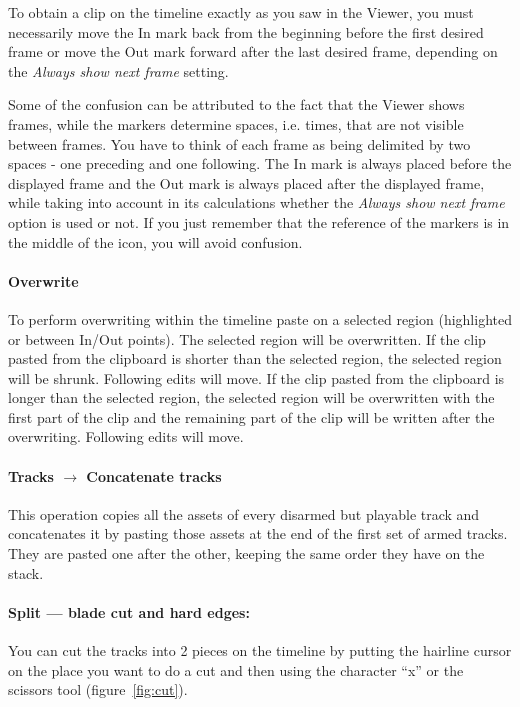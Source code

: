 To obtain a clip on the timeline exactly as you saw in the Viewer, you must necessarily move the In mark back from the beginning before the first desired frame or move the Out mark forward after the last desired frame, depending on the \textit{Always show next frame} setting. 

Some of the confusion can be attributed to the fact that the Viewer shows frames, while the markers determine spaces, i.e. times, that are not visible between frames. You have to think of each frame as being delimited by two spaces - one preceding and one following.  The In mark is always placed before the displayed frame and the Out mark is always placed after the displayed frame, while taking into account in its calculations whether the \textit{Always show next frame }option is used or not. If you just remember that the reference of the markers is in the middle of the icon, you will avoid confusion.

\paragraph{Overwrite} To perform overwriting within the timeline paste on a selected region (highlighted or
between In/Out points). The selected region will be overwritten. If the clip pasted from the clipboard
is shorter than the selected region, the selected region will be shrunk. Following edits will move. If 
the clip pasted from the clipboard is longer than the selected region, the selected region will be
overwritten with the first part of the clip and the remaining part of the clip will be written after the
overwriting. Following edits will move.

\paragraph{Tracks $\rightarrow$ Concatenate tracks} This operation copies all the assets of every disarmed but playable
track and concatenates it by pasting those assets at the end of the first set of armed tracks. They are
pasted one after the other, keeping the same order they have on the stack.

\paragraph{Split --- blade cut and hard edges:} You can cut the tracks into 2 pieces on the timeline by putting the hairline cursor on the place you want to do a cut and then using the character “x” or the scissors tool (figure~\ref{fig:cut}). 


